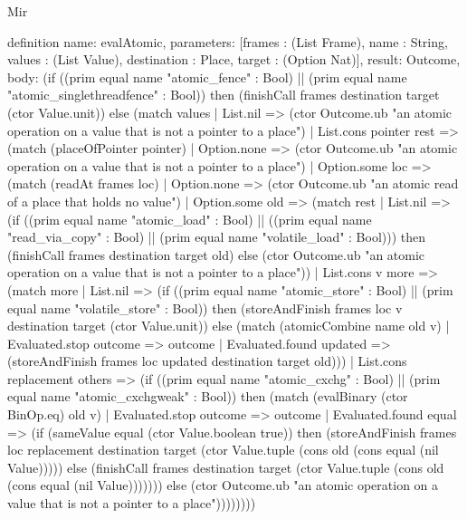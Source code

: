 \begin{lexlean}{Mir}
\begin{semanticmodule}
definition{
  name: evalAtomic,
  parameters: [frames : (List Frame), name : String, values : (List Value), destination : Place, target : (Option Nat)],
  result: Outcome,
  body: (if ((prim equal name "atomic_fence" : Bool) || (prim equal name "atomic_singlethreadfence" : Bool)) then (finishCall frames destination target (ctor Value.unit)) else (match values
    | List.nil => (ctor Outcome.ub "an atomic operation on a value that is not a pointer to a place")
    | List.cons pointer rest => (match (placeOfPointer pointer)
      | Option.none => (ctor Outcome.ub "an atomic operation on a value that is not a pointer to a place")
      | Option.some loc => (match (readAt frames loc)
        | Option.none => (ctor Outcome.ub "an atomic read of a place that holds no value")
        | Option.some old => (match rest
          | List.nil => (if ((prim equal name "atomic_load" : Bool) || ((prim equal name "read_via_copy" : Bool) || (prim equal name "volatile_load" : Bool))) then (finishCall frames destination target old) else (ctor Outcome.ub "an atomic operation on a value that is not a pointer to a place"))
          | List.cons v more => (match more
            | List.nil => (if ((prim equal name "atomic_store" : Bool) || (prim equal name "volatile_store" : Bool)) then (storeAndFinish frames loc v destination target (ctor Value.unit)) else (match (atomicCombine name old v)
              | Evaluated.stop outcome => outcome
              | Evaluated.found updated => (storeAndFinish frames loc updated destination target old)))
            | List.cons replacement others => (if ((prim equal name "atomic_cxchg" : Bool) || (prim equal name "atomic_cxchgweak" : Bool)) then (match (evalBinary (ctor BinOp.eq) old v)
              | Evaluated.stop outcome => outcome
              | Evaluated.found equal => (if (sameValue equal (ctor Value.boolean true)) then (storeAndFinish frames loc replacement destination target (ctor Value.tuple (cons old (cons equal (nil Value))))) else (finishCall frames destination target (ctor Value.tuple (cons old (cons equal (nil Value))))))) else (ctor Outcome.ub "an atomic operation on a value that is not a pointer to a place"))))))))
}


\end{semanticmodule}
\end{lexlean}
